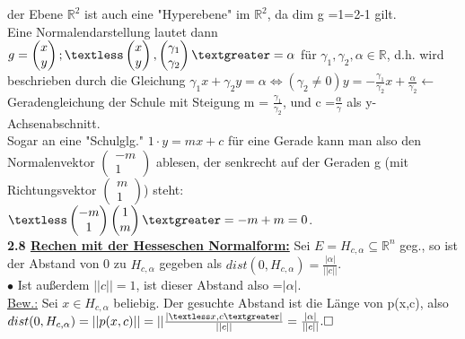 \documentclass[]{scrartcl}
\begin{document}
{der Ebene $\mathbb{R}^2$ ist auch eine "Hyperebene" im $\mathbb{R}^2$, da dim g 
=1=2-1 gilt.\\
Eine Normalendarstellung lautet dann $g={\begin{pmatrix}
		x\\
		y
\end{pmatrix} ;\textless \begin{pmatrix}
x\\
y
\end{pmatrix} ,
\begin{pmatrix}
	\gamma_1\\
	\gamma_2
\end{pmatrix}  \textgreater = \alpha}$ für $\gamma_1, \gamma_2, \alpha \in \mathbb{R}$, d.h. wird beschrieben durch die Gleichung $\gamma_1 x+ \gamma_2 y = \alpha \Leftrightarrow (\gamma_2 \neq 0) y = -\frac{\gamma_1}{\gamma_2}x + \frac{\alpha}{\gamma_2} \leftarrow$ Geradengleichung der Schule mit Steigung m = $\frac{\gamma_1}{\gamma_2}$, und c =$\frac{\alpha}{\gamma}$ als y-Achsenabschnitt.\\
Sogar an eine "Schulglg." $1\cdot y=mx+c$
 für eine Gerade kann man also den Normalenvektor $\begin{pmatrix}
 	-m\\
 	1
 \end{pmatrix}$ ablesen, der senkrecht auf der Geraden g (mit Richtungsvektor $\begin{pmatrix}
 m\\
 1
 \end{pmatrix}$) steht: $\textless \begin{pmatrix}
 -m\\
 1
 \end{pmatrix}\begin{pmatrix}
 1\\
 m
 \end{pmatrix} \textgreater = -m +m =0$.\\
 \newpage
\textbf{2.8 \underline{Rechen mit der Hesseschen Normalform:}}
 Sei $E= H_{c,\alpha}\subseteq \mathbb{R}^n$ geg., so ist der Abstand von 0 zu $H_{c,\alpha}$ gegeben als $dist(0,H_{c,\alpha})=\frac{|\alpha|}{||c||}$.\\
 $\bullet$ Ist außerdem $||c||=1$, ist dieser Abstand also =$|\alpha|$.\\
 \underline{Bew.:} Sei $x\in H_{c,\alpha}$ beliebig.
 Der gesuchte Abstand ist die Länge von p(x,c), also $dist(0, H_{c,\alpha})=||p(x,c)||=||\frac{|\textless x,c\textgreater|}{||c||}=\frac{|\alpha|}{||c||}. \square$
 \begin{figure}[h]

\end{figure}}
\end{document}
